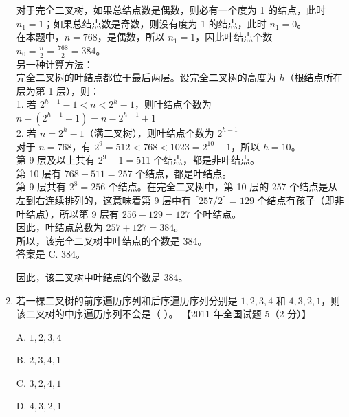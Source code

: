 \documentclass[lang=cn,newtx,10pt,scheme=chinese]{../../../elegantbook}
\begin{document}
\begin{enumerate}
        对于完全二叉树，如果总结点数是偶数，则必有一个度为 1 的结点，此时 $n_1 = 1$；如果总结点数是奇数，则没有度为 1 的结点，此时 $n_1 = 0$。\\
        
        在本题中，$n = 768$，是偶数，所以 $n_1 = 1$，因此叶结点个数 $n_0 = \frac{n}{2} = \frac{768}{2} = 384$。\\
        
        另一种计算方法：\\
        完全二叉树的叶结点都位于最后两层。设完全二叉树的高度为 $h$（根结点所在层为第 1 层），则：\\
        1. 若 $2^{h-1} - 1 < n < 2^h - 1$，则叶结点个数为 $n - (2^{h-1} - 1) = n - 2^{h-1} + 1$\\
        2. 若 $n = 2^h - 1$（满二叉树），则叶结点个数为 $2^{h-1}$\\
        
        对于 $n = 768$，有 $2^9 = 512 < 768 < 1023 = 2^{10} - 1$，所以 $h = 10$。\\
        第 9 层及以上共有 $2^9 - 1 = 511$ 个结点，都是非叶结点。\\
        第 10 层有 $768 - 511 = 257$ 个结点，都是叶结点。\\
        第 9 层共有 $2^8 = 256$ 个结点。在完全二叉树中，第 10 层的 $257$ 个结点是从左到右连续排列的，这意味着第 9 层中有 $\lceil 257/2 \rceil = 129$ 个结点有孩子（即非叶结点），所以第 9 层有 $256 - 129 = 127$ 个叶结点。\\
        
        因此，叶结点总数为 $257 + 127 = 384$。\\
        
        所以，该完全二叉树中叶结点的个数是 384。\\
        
        答案是 C. 384。
        
        因此，该二叉树中叶结点的个数是 384。\\
    
        \item 若一棵二叉树的前序遍历序列和后序遍历序列分别是 $1, 2, 3, 4$ 和 $4, 3, 2, 1$，则该二叉树的中序遍历序列不会是（ ）。  
        【2011 年全国试题 5（2 分）】  
    
        A. $1, 2, 3, 4$  
    
        B. $2, 3, 4, 1$  
    
        C. $3, 2, 4, 1$  
    
        D. $4, 3, 2, 1$  
    

\end{enumerate}
\end{document}
